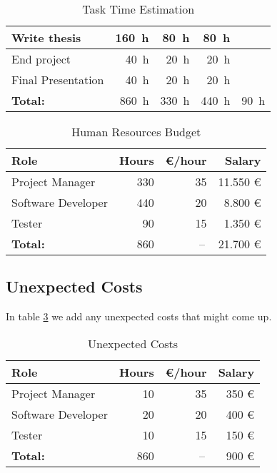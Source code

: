\begin{table}[H]
\begin{center}
\begin{tabular}{|l|r|r|r|r|}
			Write thesis & \SI{160}{\hour}& \SI{80}{\hour} & \SI{80}{\hour} & \\\hline
			
			End project & \SI{40}{\hour}& \SI{20}{\hour} & \SI{20}{\hour} & \\\hline
			
			Final Presentation & \SI{40}{\hour}& \SI{20}{\hour} & \SI{20}{\hour} & \\\hline\hline 
			
			\bf Total: & \SI{860}{\hour} & \SI{330}{\hour} & \SI{440}{\hour} & \SI{90}{\hour} \\\hline
		\end{tabular}
		\caption{Task Time Estimation}
		\label{task::time}
	\end{center}
\end{table}
\begin{table}[H]
	\begin{center}
		\begin{tabular}{ |l|r|r|r| }
			\hline
			\bf Role & \bf Hours & \bf \euro/hour & \bf Salary \\\hline\hline
			
			Project Manager & 330 & 35 & 11.550 \euro \\\hline
			
			Software Developer & 440 & 20 & 8.800 \euro \\\hline
			
			Tester & 90 & 15 & 1.350 \euro \\\hline\hline
			\bf Total: & 860 & --\, & 21.700 \euro \\\hline
		\end{tabular}
		\caption{Human Resources Budget}
		\label{budget::human}
	\end{center}
\end{table}


\subsection{Unexpected Costs}
In table \ref{budget::unexpected} we add any unexpected costs that might come up.

\begin{table}[H]
	\begin{center}
		\begin{tabular}{ |l|r|r|r| }
			\hline
			\bf Role & \bf Hours & \bf \euro/hour & \bf Salary \\\hline\hline
			
			Project Manager & 10 & 35 & 350 \euro \\\hline
			
			Software Developer & 20 & 20 & 400 \euro \\\hline
			
			Tester & 10 & 15 & 150 \euro \\\hline\hline
			
			\bf Total: & 860 & --\, & 900 \euro \\\hline
		\end{tabular}
		\caption{Unexpected Costs}
		\label{budget::unexpected}
	\end{center}
\end{table}

